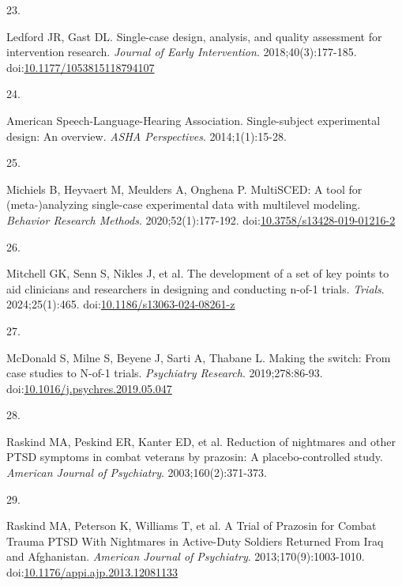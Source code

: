 \documentclass[
  11pt,
]{article}
\newlength{\cslhangindent}
\newlength{\csllabelwidth}
\newenvironment{CSLReferences}[2] %
 {\begin{list}{}{%
  \setlength{\itemindent}{0pt}
  \setlength{\leftmargin}{0pt}
  \setlength{\parsep}{0pt}
  \ifodd #1
   \setlength{\leftmargin}{\cslhangindent}
   \setlength{\itemindent}{-1\cslhangindent}
  \fi
  \setlength{\itemsep}{#2\baselineskip}}}
 {\end{list}}
\newcommand{\CSLLeftMargin}[1]{\parbox[t]{\csllabelwidth}{\strut#1\strut}}
\newcommand{\CSLRightInline}[1]{\parbox[t]{\linewidth - \csllabelwidth}{\strut#1\strut}}
\begin{document}
\begin{CSLReferences}{0}{1}
\CSLLeftMargin{23. }%
\CSLRightInline{Ledford JR, Gast DL. Single-case design, analysis, and
quality assessment for intervention research. \emph{Journal of Early
Intervention}. 2018;40(3):177-185.
doi:\href{https://doi.org/10.1177/1053815118794107}{10.1177/1053815118794107}}

\CSLLeftMargin{24. }%
\CSLRightInline{American Speech-Language-Hearing Association.
Single-subject experimental design: {An} overview. \emph{ASHA
Perspectives}. 2014;1(1):15-28.}

\CSLLeftMargin{25. }%
\CSLRightInline{Michiels B, Heyvaert M, Meulders A, Onghena P.
{MultiSCED}: {A} tool for (meta-)analyzing single-case experimental data
with multilevel modeling. \emph{Behavior Research Methods}.
2020;52(1):177-192.
doi:\href{https://doi.org/10.3758/s13428-019-01216-2}{10.3758/s13428-019-01216-2}}

\CSLLeftMargin{26. }%
\CSLRightInline{{Mitchell GK, Senn S, Nikles J, et al.} The development
of a set of key points to aid clinicians and researchers in designing
and conducting n-of-1 trials. \emph{Trials}. 2024;25(1):465.
doi:\href{https://doi.org/10.1186/s13063-024-08261-z}{10.1186/s13063-024-08261-z}}

\CSLLeftMargin{27. }%
\CSLRightInline{McDonald S, Milne S, Beyene J, Sarti A, Thabane L.
Making the switch: {From} case studies to {N-of-1} trials.
\emph{Psychiatry Research}. 2019;278:86-93.
doi:\href{https://doi.org/10.1016/j.psychres.2019.05.047}{10.1016/j.psychres.2019.05.047}}

\CSLLeftMargin{28. }%
\CSLRightInline{{Raskind MA, Peskind ER, Kanter ED, et al.} Reduction of
nightmares and other {PTSD} symptoms in combat veterans by prazosin: A
placebo-controlled study. \emph{American Journal of Psychiatry}.
2003;160(2):371-373.}

\CSLLeftMargin{29. }%
\CSLRightInline{Raskind MA, Peterson K, Williams T, et al. A {Trial} of
{Prazosin} for {Combat Trauma PTSD With Nightmares} in {Active-Duty
Soldiers Returned From Iraq} and {Afghanistan}. \emph{American Journal
of Psychiatry}. 2013;170(9):1003-1010.
doi:\href{https://doi.org/10.1176/appi.ajp.2013.12081133}{10.1176/appi.ajp.2013.12081133}}


\end{CSLReferences}
\end{document}
